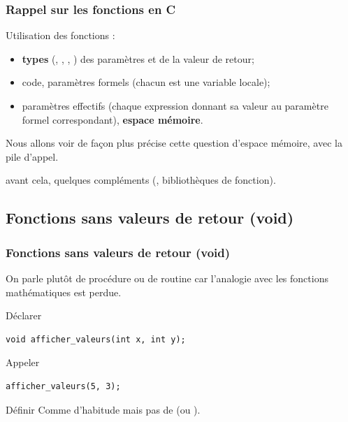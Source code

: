 \documentclass[xcolor=pdftex,svgnames,table]{beamer}
\begin{document}
\begin{frame}
  \frametitle{Rappel sur les fonctions en C\nowrite}
 Utilisation des fonctions :
  \begin{itemize}
    \item {} \textbf{types} (, ,
      , ) des paramètres et de la valeur de retour;
    \item {}  code, paramètres formels (chacun est
      une variable locale);
    \item {} paramètres effectifs (chaque expression
      donnant sa valeur au paramètre formel correspondant), \textbf{espace mémoire}.
  \end{itemize}
\pause 
\pause
Nous allons voir de façon plus précise cette question
d'espace mémoire, avec la pile d'appel.

\pause avant cela, quelques compléments (, bibliothèques de fonction).
\end{frame}


\subsection[Procédures]{Fonctions sans valeurs de retour (void)}
\begin{frame}[fragile]
  \frametitle{Fonctions sans valeurs de retour (void)}

On parle plutôt de procédure ou de routine car l'analogie avec les
fonctions mathématiques est perdue.

 \begin{block}{Déclarer}
    \begin{lstlisting}[basicstyle=\ttfamily\small] 
void afficher_valeurs(int x, int y);
     \end{lstlisting}
  \end{block}

  \begin{block}{Appeler}
  \begin{lstlisting}[basicstyle=\ttfamily\small] 
afficher_valeurs(5, 3);
   \end{lstlisting}  
  \end{block}

  \begin{block}{Définir}
Comme d'habitude mais pas de  (ou ).
\end{block}
\end{frame}
\end{document}
